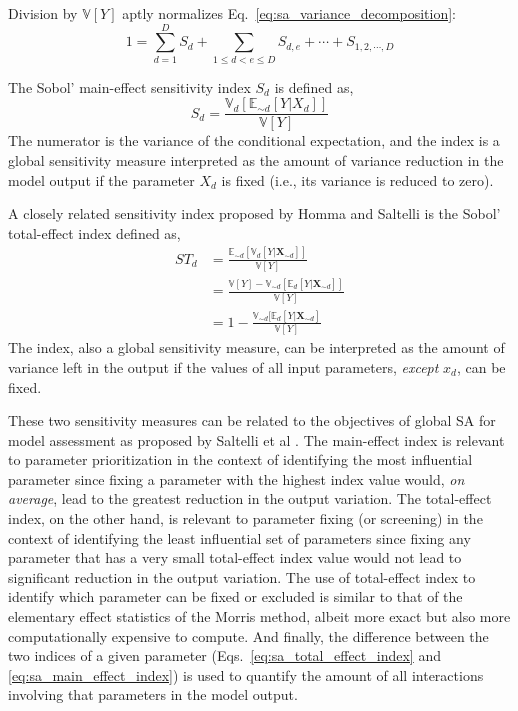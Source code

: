 Division by $\mathbb{V}[Y]$ aptly normalizes Eq.~\ref{eq:sa_variance_decomposition}:
\begin{equation}
  1 = \sum_{d = 1}^{D} S_d + \sum_{1 \leq d < e \leq D} S_{d,e} + \cdots + S_{1,2,\cdots,D}
\label{eq:sa_normalized_variance}
\end{equation}

The Sobol' main-effect sensitivity index $S_d$ is defined as,
\begin{equation}
  S_d = \frac{\mathbb{V}_d [\mathbb{E}_{\sim d} [Y|X_d]]}{\mathbb{V}[Y]}
\label{eq:sa_main_effect_index}
\end{equation}
The numerator is the variance of the conditional expectation,
and the index is a global sensitivity measure interpreted as the amount of variance reduction in the model output if the parameter $X_d$ is fixed (i.e., its variance is reduced to zero).

A closely related sensitivity index proposed by Homma and Saltelli \cite{Homma1996} is the Sobol' total-effect index defined as,
\begin{equation}
  \begin{split}
    ST_{d} & = \frac{\mathbb{E}_{\sim d}[\mathbb{V}_{d}[Y|\mathbf{X}_{\sim d}]]}{\mathbb{V}[Y]} \\
           & = \frac{\mathbb{V}[Y] - \mathbb{V}_{\sim d}\left[\mathbb{E}_{d}\left[Y|\mathbf{X}_{\sim d}\right]\right]}{\mathbb{V}[Y]} \\
           & = 1 - \frac{\mathbb{V}_{\sim d}[\mathbb{E}_{d}[Y|\mathbf{X}_{\sim d}]}{\mathbb{V}[Y]}
  \end{split}
\label{eq:sa_total_effect_index}
\end{equation}
The index, also a global sensitivity measure, can be interpreted as the amount of variance left in the output if the values of all input parameters, 
\emph{except} $x_d$, can be fixed.

These two sensitivity measures can be related to the objectives of global SA for model assessment as proposed by Saltelli et al \cite{Saltelli2004,Saltelli2008}.
The main-effect index is relevant to parameter prioritization in the context of identifying the most influential parameter since fixing a parameter with the highest index value would, \emph{on average}, lead to the greatest reduction in the output variation.
The total-effect index, on the other hand, is relevant to parameter fixing (or screening) in the context of identifying the least influential set of parameters since fixing any parameter that has a very small total-effect index value would not lead to significant reduction in the output variation.
The use of total-effect index to identify which parameter can be fixed or excluded is similar to that of the elementary effect statistics of the Morris method, 
albeit more exact but also more computationally expensive to compute.
And finally, the difference between the two indices of a given parameter (Eqs.~\ref{eq:sa_total_effect_index} and \ref{eq:sa_main_effect_index}) is used to quantify the amount of all interactions involving that parameters in the model output.
